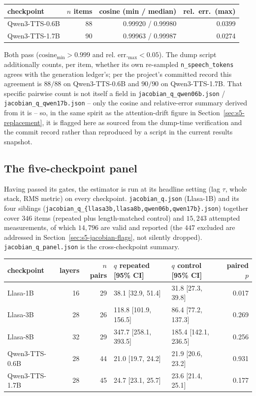 \documentclass[11pt]{article}
\begin{document}
\begin{center}
\begin{tabular}{lrrr}
\toprule
checkpoint & $n$ items & cosine (min / median) & rel.\ err.\ (max) \\
\midrule
Qwen3-TTS-0.6B & 88 & 0.99920 / 0.99980 & 0.0399 \\
Qwen3-TTS-1.7B & 90 & 0.99963 / 0.99987 & 0.0274 \\
\bottomrule
\end{tabular}
\end{center}

Both pass ($\text{cosine}_{\min}>0.999$ and $\text{rel.\ err.}_{\max}<0.05$).
The dump script additionally counts, per item, whether its own re-sampled
\texttt{n\_speech\_tokens} agrees with the generation ledger's; per the
project's committed record this agreement is $88/88$ on Qwen3-TTS-0.6B and
$90/90$ on Qwen3-TTS-1.7B. That specific pairwise count is not itself a field
in \texttt{jacobian\_q\_qwen06b.json} / \texttt{jacobian\_q\_qwen17b.json} --
only the cosine and relative-error summary derived from it is -- so, in the
same spirit as the attention-drift figure in
Section~\ref{sec:s5-replacement}, it is flagged here as sourced from the
dump-time verification and the commit record rather than reproduced by a
script in the current results snapshot.

\subsection{The five-checkpoint panel}
\label{sec:s5-jacobian-panel}

Having passed its gates, the estimator is run at its headline setting (lag
$\tau$, whole stack, RMS metric) on every checkpoint. \texttt{jacobian\_q.json}
(Llasa-1B) and its four siblings
(\texttt{jacobian\_q\_\{llasa3b,llasa8b,qwen06b,qwen17b\}.json}) together cover
$346$ items (repeated plus length-matched control) and $15{,}243$ attempted
measurements, of which $14{,}796$ are valid and reported (the $447$ excluded
are addressed in Section~\ref{sec:s5-jacobian-flags}, not silently dropped).
\texttt{jacobian\_q\_panel.json} is the cross-checkpoint summary.

\begin{center}
\begin{tabular}{lrrp{2.8cm}p{2.8cm}r}
\toprule
checkpoint & layers & $n$ pairs & $q$ repeated [95\% CI] & $q$ control [95\% CI] & paired $p$ \\
\midrule
Llasa-1B & 16 & 29 & 38.1 [32.9, 51.4] & 31.8 [27.3, 39.8] & 0.017 \\
Llasa-3B & 28 & 26 & 118.8 [101.9, 156.5] & 86.4 [77.2, 137.3] & 0.269 \\
Llasa-8B & 32 & 29 & 347.7 [258.1, 393.5] & 185.4 [142.1, 236.5] & 0.256 \\
Qwen3-TTS-0.6B & 28 & 44 & 21.0 [19.7, 24.2] & 21.9 [20.6, 23.2] & 0.931 \\
Qwen3-TTS-1.7B & 28 & 45 & 24.7 [23.1, 25.7] & 23.6 [21.4, 25.1] & 0.177 \\
\bottomrule
\end{tabular}
\end{center}
\end{document}
